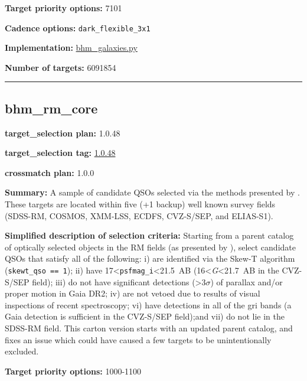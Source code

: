 \noindent\textbf{Target priority options:} 7101

\noindent\textbf{Cadence options:} \texttt{dark\_flexible\_3x1}

\noindent\textbf{Implementation:}
\href{https://github.com/sdss/target_selection/blob/1.3.15/python/target_selection/cartons/bhm_galaxies.py}{bhm\_galaxies.py}

\noindent\textbf{Number of targets:} 6091854

\begin{center}\rule{0.5\linewidth}{0.5pt}\end{center}

\hypertarget{bhm_rm_core_plan1.0.48}{%
\subsection{bhm\_rm\_core}\label{bhm_rm_core_plan1.0.48}}

\noindent\textbf{target\_selection plan:} 1.0.48

\noindent\textbf{target\_selection tag:}
\href{https://github.com/sdss/target_selection/tree/1.0.48/}{1.0.48}

\noindent\textbf{crossmatch plan:} 1.0.0

\noindent\textbf{Summary:} A sample of candidate QSOs selected via the methods
presented by
\citet{Yang2022}. These targets are located within five (+1 backup) well
known survey fields (SDSS-RM, COSMOS, XMM-LSS, ECDFS, CVZ-S/SEP, and
ELIAS-S1).

\noindent\textbf{Simplified description of selection criteria:} Starting from a
parent catalog of optically selected objects in the RM fields (as
presented by
\citealt{Yang2022}), select candidate QSOs that satisfy all of the
following: i) are identified via the Skew-T algorithm
(\texttt{skewt\_qso\ ==\ 1}); ii) have
17\textless{}\texttt{psfmag\_i}\textless21.5~AB
(16\textless{}\emph{G}\textless21.7~AB in the CVZ-S/SEP field); iii) do
not have significant detections (\textgreater3$\sigma$) of parallax and/or
proper motion in Gaia DR2; iv) are not vetoed due to results of visual
inspections of recent spectroscopy; vi) have detections in all of the
gri bands (a Gaia detection is sufficient in the CVZ-S/SEP field);and
vii) do not lie in the SDSS-RM field. This carton version starts with an
updated parent catalog, and fixes an issue which could have caused a few
targets to be unintentionally excluded.


\noindent\textbf{Target priority options:} 1000-1100

